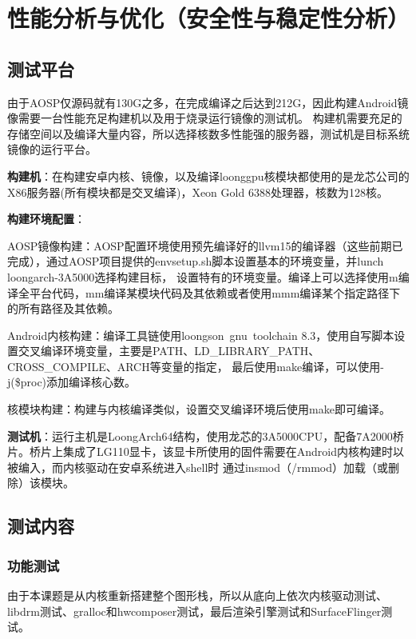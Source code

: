 
\chapter{性能分析与优化（安全性与稳定性分析）}

\section{测试平台}
由于AOSP仅源码就有130G之多，在完成编译之后达到212G，因此构建Android镜像需要一台性能充足构建机以及用于烧录运行镜像的测试机。
构建机需要充足的存储空间以及编译大量内容，所以选择核数多性能强的服务器，测试机是目标系统镜像的运行平台。

\textbf{构建机}：在构建安卓内核、镜像，以及编译loonggpu核模块都使用的是龙芯公司的X86服务器(所有模块都是交叉编译)，Xeon Gold 6388处理器，核数为128核。

\textbf{构建环境配置}：

    AOSP镜像构建：AOSP配置环境使用预先编译好的llvm15的编译器（这些前期已完成），通过AOSP项目提供的envsetup.sh脚本设置基本的环境变量，并lunch loongarch-3A5000选择构建目标，
        设置特有的环境变量。编译上可以选择使用m编译全平台代码，mm编译某模块代码及其依赖或者使用mmm编译某个指定路径下的所有路径及其依赖。

    Android内核构建：编译工具链使用loongson\ gnu\ toolchain 8.3，使用自写脚本设置交叉编译环境变量，主要是PATH、LD\_LIBRARY\_PATH、CROSS\_COMPILE、ARCH等变量的指定，
        最后使用make编译，可以使用-j(\$proc)添加编译核心数。

    核模块构建：构建与内核编译类似，设置交叉编译环境后使用make即可编译。

\textbf{测试机}：运行主机是LoongArch64结构，使用龙芯的3A5000CPU，配备7A2000桥片。桥片上集成了LG110显卡，该显卡所使用的固件需要在Android内核构建时以被编入，而内核驱动在安卓系统进入shell时
    通过insmod（/rmmod）加载（或删除）该模块。

\section{测试内容}

\subsection{功能测试}
由于本课题是从内核重新搭建整个图形栈，所以从底向上依次内核驱动测试、libdrm测试、gralloc和hwcomposer测试，最后渲染引擎测试和SurfaceFlinger测试。

